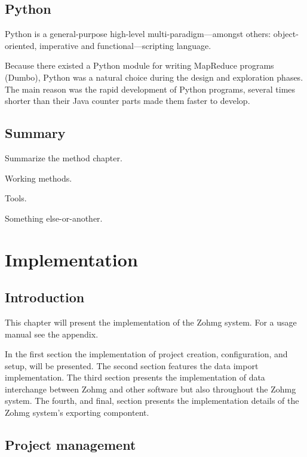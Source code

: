 \section{Python}

Python is a general-purpose high-level multi-paradigm---amongst others:
object-oriented, imperative and functional---scripting language.
\cite{python}

Because there existed a Python module for writing MapReduce programs (Dumbo),
Python was a natural choice during the design and exploration phases. The main
reason was the rapid development of Python programs, several times shorter than
their Java counter parts made them faster to develop.


\section*{Summary}

Summarize the method chapter.

Working methods.

Tools.

Something else-or-another.



\chapter{Implementation}



\section*{Introduction}

This chapter will present the implementation of the Zohmg system. For a usage
manual see the appendix.


In the first section the implementation of project creation, configuration, and
setup, will be presented. The second section features the data import
implementation. The third section presents the implementation of data
interchange between Zohmg and other software but also throughout the Zohmg
system. The fourth, and final, section presents the implementation details of
the Zohmg system's exporting compontent.


\section{Project management}

